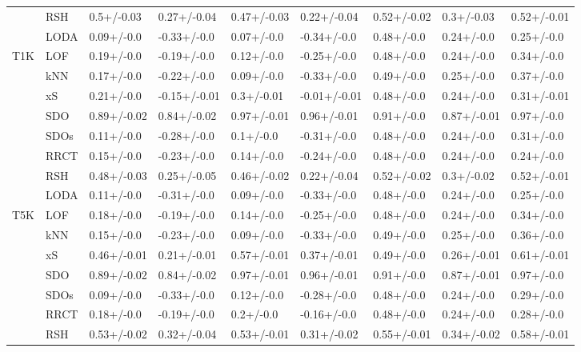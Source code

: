 \begin{table}
\begin{tabular}{lllllllll}
      & RSH &   0.5+/-0.03 &   0.27+/-0.04 &  0.47+/-0.03 &   0.22+/-0.04 &  0.52+/-0.02 &   0.3+/-0.03 &  0.52+/-0.01 \\
      & LODA &   0.09+/-0.0 &   -0.33+/-0.0 &   0.07+/-0.0 &   -0.34+/-0.0 &   0.48+/-0.0 &   0.24+/-0.0 &   0.25+/-0.0 \\
T1K & LOF &   0.19+/-0.0 &   -0.19+/-0.0 &   0.12+/-0.0 &   -0.25+/-0.0 &   0.48+/-0.0 &   0.24+/-0.0 &   0.34+/-0.0 \\
      & kNN &   0.17+/-0.0 &   -0.22+/-0.0 &   0.09+/-0.0 &   -0.33+/-0.0 &   0.49+/-0.0 &   0.25+/-0.0 &   0.37+/-0.0 \\
      & xS &   0.21+/-0.0 &  -0.15+/-0.01 &   0.3+/-0.01 &  -0.01+/-0.01 &   0.48+/-0.0 &   0.24+/-0.0 &  0.31+/-0.01 \\
      & SDO &  0.89+/-0.02 &   0.84+/-0.02 &  0.97+/-0.01 &   0.96+/-0.01 &   0.91+/-0.0 &  0.87+/-0.01 &   0.97+/-0.0 \\
      & SDOs &   0.11+/-0.0 &   -0.28+/-0.0 &    0.1+/-0.0 &   -0.31+/-0.0 &   0.48+/-0.0 &   0.24+/-0.0 &   0.31+/-0.0 \\
      & RRCT &   0.15+/-0.0 &   -0.23+/-0.0 &   0.14+/-0.0 &   -0.24+/-0.0 &   0.48+/-0.0 &   0.24+/-0.0 &   0.24+/-0.0 \\
      & RSH &  0.48+/-0.03 &   0.25+/-0.05 &  0.46+/-0.02 &   0.22+/-0.04 &  0.52+/-0.02 &   0.3+/-0.02 &  0.52+/-0.01 \\
      & LODA &   0.11+/-0.0 &   -0.31+/-0.0 &   0.09+/-0.0 &   -0.33+/-0.0 &   0.48+/-0.0 &   0.24+/-0.0 &   0.25+/-0.0 \\
T5K & LOF &   0.18+/-0.0 &   -0.19+/-0.0 &   0.14+/-0.0 &   -0.25+/-0.0 &   0.48+/-0.0 &   0.24+/-0.0 &   0.34+/-0.0 \\
      & kNN &   0.15+/-0.0 &   -0.23+/-0.0 &   0.09+/-0.0 &   -0.33+/-0.0 &   0.49+/-0.0 &   0.25+/-0.0 &   0.36+/-0.0 \\
      & xS &  0.46+/-0.01 &   0.21+/-0.01 &  0.57+/-0.01 &   0.37+/-0.01 &   0.49+/-0.0 &  0.26+/-0.01 &  0.61+/-0.01 \\
      & SDO &  0.89+/-0.02 &   0.84+/-0.02 &  0.97+/-0.01 &   0.96+/-0.01 &   0.91+/-0.0 &  0.87+/-0.01 &   0.97+/-0.0 \\
      & SDOs &   0.09+/-0.0 &   -0.33+/-0.0 &   0.12+/-0.0 &   -0.28+/-0.0 &   0.48+/-0.0 &   0.24+/-0.0 &   0.29+/-0.0 \\
      & RRCT &   0.18+/-0.0 &   -0.19+/-0.0 &    0.2+/-0.0 &   -0.16+/-0.0 &   0.48+/-0.0 &   0.24+/-0.0 &   0.28+/-0.0 \\
      & RSH &  0.53+/-0.02 &   0.32+/-0.04 &  0.53+/-0.01 &   0.31+/-0.02 &  0.55+/-0.01 &  0.34+/-0.02 &  0.58+/-0.01 \\

\end{tabular}
\end{table}
